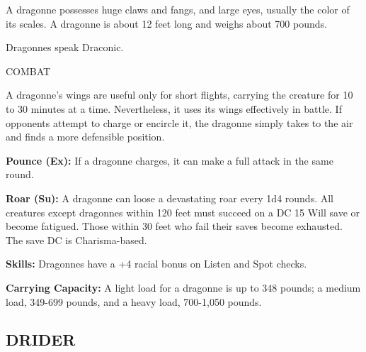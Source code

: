 \documentclass{article}
\begin{document}
{A dragonne possesses huge claws and fangs, and large eyes, usually the color of 
its scales. A dragonne is about 12 feet long and weighs about 700 pounds.

Dragonnes speak Draconic.

COMBAT

A dragonne's wings are useful only for short flights, carrying the creature for 
10 to 30 minutes at a time. Nevertheless, it uses its wings effectively in battle. 
If opponents attempt to charge or encircle it, the dragonne simply takes to the 
air and finds a more defensible position.

\textbf{Pounce (Ex): }If a dragonne charges, it can make a full attack in the same 
round.

\textbf{Roar (Su):} A dragonne can loose a devastating roar every 1d4 rounds. All 
creatures except dragonnes within 120 feet must succeed on a DC 15 Will save or 
become fatigued. Those within 30 feet who fail their saves become exhausted. The 
save DC is Charisma-based.

\textbf{Skills: }Dragonnes have a +4 racial bonus on Listen and Spot checks. 

\textbf{Carrying Capacity:} A light load for a dragonne is up to 348 pounds; a 
medium load, 349-699 pounds, and a heavy load, 700-1,050 pounds.

\vspace{12pt}
\subsection*{{\LARGE{}DRIDER}}

}
\end{document}
